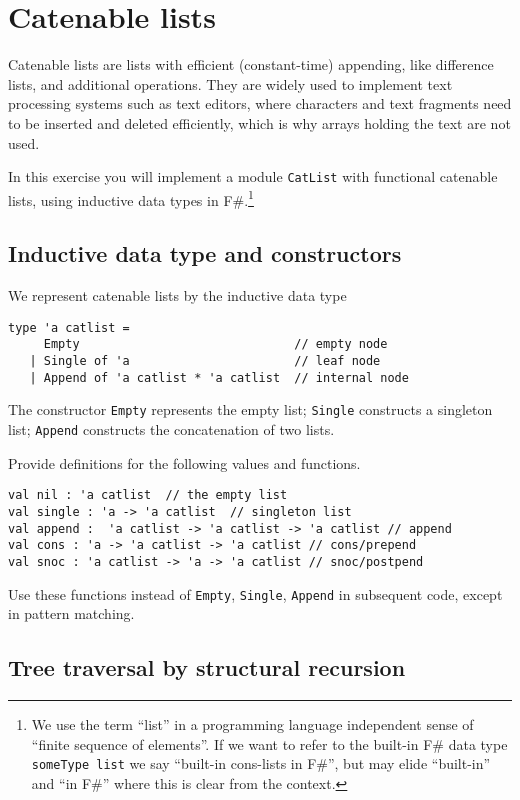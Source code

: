\section*{Catenable lists}

Catenable lists are lists with efficient (constant-time) appending, like difference lists, and additional operations.  They are widely used to implement text processing systems such as text editors, where characters and text fragments need to be inserted and deleted efficiently, which is why arrays holding the text are not used.

In this exercise you will implement a module \texttt{CatList} with functional catenable lists, using inductive data types in F\#.\footnote{We use the term ``list'' in a programming language independent sense of ``finite sequence of elements''.  If we want to refer to the built-in F\# data type \texttt{someType list} we say ``built-in cons-lists in F\#'', but may elide ``built-in'' and ``in F\#'' where this is clear from the context.}


\subsection*{Inductive data type and constructors}

We represent catenable lists by the inductive data type 
\begin{verbatim}
type 'a catlist = 
     Empty                              // empty node
   | Single of 'a                       // leaf node
   | Append of 'a catlist * 'a catlist  // internal node
\end{verbatim}
The constructor \texttt{Empty} represents the empty list; \texttt{Single} constructs a singleton list; \texttt{Append} constructs the concatenation of two lists.

Provide definitions for the following values and functions. 
\begin{verbatim}
val nil : 'a catlist  // the empty list
val single : 'a -> 'a catlist  // singleton list
val append :  'a catlist -> 'a catlist -> 'a catlist // append
val cons : 'a -> 'a catlist -> 'a catlist // cons/prepend
val snoc : 'a catlist -> 'a -> 'a catlist // snoc/postpend
\end{verbatim}
Use these functions instead of \verb|Empty|, \verb|Single|, \verb|Append| in subsequent code, except in pattern matching.

\subsection*{Tree traversal by structural recursion}

